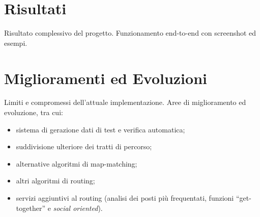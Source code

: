 \section{Risultati}
Risultato complessivo del progetto. Funzionamento end-to-end con screenshot ed esempi.
\section{Miglioramenti ed Evoluzioni}
Limiti e compromessi dell'attuale implementazione. Aree di miglioramento ed evoluzione, tra cui:
\begin{itemize}
\item sistema di gerazione dati di test e verifica automatica;
\item suddivisione ulteriore dei tratti di percorso;
\item alternative algoritmi di map-matching;
\item altri algoritmi di routing;
\item servizi aggiuntivi al routing (analisi dei posti più frequentati, funzioni ``get-together'' e \emph{social oriented}).
\end{itemize}